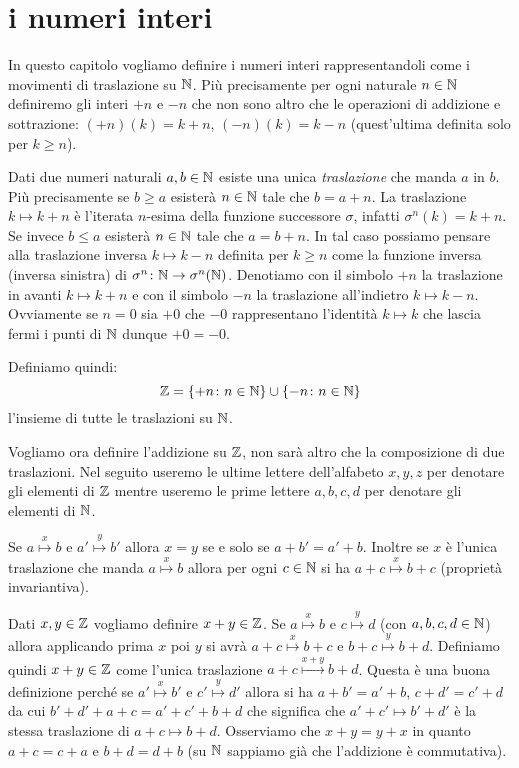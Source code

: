\section{i numeri interi}

In questo capitolo vogliamo definire i numeri interi rappresentandoli 
come i movimenti di traslazione su ${\mathbb N}$. 
Più precisamente per ogni naturale $n\in{\mathbb N}$ definiremo gli interi 
$+n$ e $-n$ che non sono altro che le operazioni di addizione e sottrazione: 
$(+n)(k) = k+n$, $(-n)(k) = k-n$ (quest'ultima definita solo per $k\ge n$).

Dati due numeri naturali $a,b \in {\mathbb N}$ esiste una unica \emph{traslazione}
che manda $a$ in $b$.
Più precisamente se $b\ge a$ esisterà $n\in {\mathbb N}$ tale che $b=a+n$.
La traslazione $k\mapsto k+n$ è l'iterata $n$-esima della funzione 
successore $\sigma$, infatti $\sigma^n(k) = k+n$.
Se invece $b\le a$ esisterà $n\in {\mathbb N}$ tale che $a=b+n$. 
In tal caso possiamo pensare alla traslazione inversa $k\mapsto k-n$ 
definita per $k\ge n$ come la funzione inversa (inversa sinistra) di 
$\sigma^n\colon {\mathbb N}\to \sigma^n({\mathbb N})$.
Denotiamo con il simbolo $+n$ la traslazione in avanti $k\mapsto k+n$ e 
con il simbolo $-n$ la traslazione all'indietro $k\mapsto k-n$.
Ovviamente se $n=0$ sia $+0$ che $-0$ rappresentano l'identità $k\mapsto k$
che lascia fermi i punti di ${\mathbb N}$ dunque $+0=-0$.

Definiamo quindi:
\[
  {\mathbb Z} = {\left\{ +n\colon n\in {\mathbb N} \right\}} \cup {\left\{ -n\colon n\in {\mathbb N}\right\}}
\]
l'insieme di tutte le traslazioni su ${\mathbb N}$.

Vogliamo ora definire l'addizione su ${\mathbb Z}$, non sarà altro che la composizione 
di due traslazioni.
Nel seguito useremo le ultime lettere dell'alfabeto 
$x,y,z$ per denotare gli elementi di ${\mathbb Z}$ mentre 
useremo le prime lettere $a,b,c,d$ per denotare 
gli elementi di ${\mathbb N}$.

Se $a\stackrel x \mapsto b$ e $a'\stackrel y \mapsto b'$
allora $x=y$ se e solo se $a+b'=a'+b$.
Inoltre se $x$ è l'unica traslazione che manda $a\stackrel x \mapsto b$ 
allora per ogni $c\in {\mathbb N}$ si ha $a+c\stackrel x \mapsto b+c$
(proprietà invariantiva).

Dati $x,y\in {\mathbb Z}$ vogliamo definire $x+y\in {\mathbb Z}$.
Se $a\stackrel x\mapsto b$
e $c\stackrel y\mapsto d$ 
(con $a,b,c,d\in {\mathbb N}$)
allora applicando prima $x$ poi $y$ 
si avrà $a+c\stackrel x\mapsto b+c$ 
e $b+c\stackrel y\mapsto b+d$. 
Definiamo quindi $x+y\in {\mathbb Z}$ come l'unica traslazione 
$a+c \stackrel{x+y} \mapsto b+d$.
Questa è una buona definizione perché se $a'\stackrel x \mapsto b'$ 
e $c'\stackrel y \mapsto d'$ allora 
si ha $a+b'=a'+b$, $c+d'=c'+d$ 
da cui 
$b'+d' + a+c = a'+c' + b+d$ 
che significa che $a'+c'\mapsto b'+d'$ 
è la stessa traslazione di $a+c\mapsto b+d$.
Osserviamo che $x+y=y+x$ in quanto $a+c=c+a$ e $b+d=d+b$
(su ${\mathbb N}$ sappiamo già che l'addizione è commutativa).

